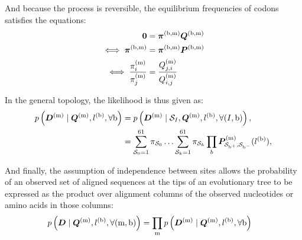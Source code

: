 And because the process is reversible, the equilibrium frequencies of \glspl{codon} satisfies the equations:
\begin{align}
    \bm{0} & = \bm{\pi}^{(\text{b}, \text{m})} \bm{Q}^{(\text{b}, \text{m})} \\
    \iff \bm{\pi}^{(\text{b}, \text{m})} & = \bm{\pi}^{(\text{b}, \text{m})} \bm{P}^{(\text{b}, \text{m})} \\
    \iff \dfrac{\pi_{{i}}^{(\text{m})}}{\pi_{{j}}^{(\text{m})}} & = \dfrac{Q_{{j}, {i}}^{(\text{m})}}{Q_{{i}, {j}}^{(\text{m})}}
\end{align}

In the general topology, the \gls{likelihood} is thus given as:
\begin{align}
    p\left(\bm{D}^{(\text{m})} \mid \bm{Q}^{(\text{m})}, l^{(\text{b})}, \forall \text{b} \right) & = p\left(\bm{D}^{(\text{m})} \mid \mathcal{S}_{I}, \bm{Q}^{(\text{m})}, l^{(\text{b})}, \forall (I, \text{b}) \right), \\
    & = \sum\limits_{\mathcal{S}_{0}=1}^{61} \pi_{\mathcal{S}_{0}} \hdots \sum\limits_{\mathcal{S}_{k}=1}^{61} \pi_{\mathcal{S}_{k}} \prod_{b} \bm{P}^{(\text{m})}_{\mathcal{S}_{\text{b}^{+}}, \mathcal{S}_{\text{b}^{-}}}(l^{(\text{b})}), \label{eq:likelihood-site}
\end{align}

And finally, the assumption of independence between sites allows the probability of an observed set of aligned sequences at the tips of an evolutionary tree to be expressed as the product over alignment columns of the observed nucleotides or amino acids in those columns:
\begin{align}
    p\left(\bm{D} \mid \bm{Q}^{(\text{m})}, l^{(\text{b})}, \forall (\text{m}, \text{b}) \right) & = \prod_{\text{m}} p\left(\bm{D}^{(\text{m})} \mid \bm{Q}^{(\text{m})}, l^{(\text{b})}, \forall \text{b} \right) \label{eq:likelihood}
\end{align}

